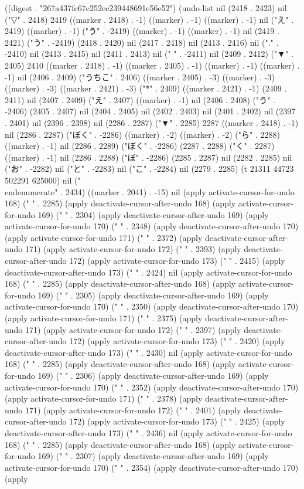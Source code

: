 
((digest . "267a437fc67e252ee239448691e56e52") (undo-list nil (2418 . 2423) nil ("▽" . 2418) 2419 ((marker . 2418) . -1) ((marker) . -1) ((marker) . -1) nil ("え" . 2419) ((marker) . -1) ("う" . -2419) ((marker) . -1) ((marker) . -1) nil (2419 . 2421) ("う" . -2419) (2418 . 2420) nil (2417 . 2418) nil (2413 . 2416) nil ("." . -2410) nil (2413 . 2415) nil (2411 . 2413) nil (" " . -2411) nil (2409 . 2412) ("▼" . 2405) 2410 ((marker . 2418) . -1) ((marker . 2405) . -1) ((marker) . -1) ((marker) . -1) nil (2406 . 2409) ("うちこ" . 2406) ((marker . 2405) . -3) ((marker) . -3) ((marker) . -3) ((marker . 2421) . -3) ("*" . 2409) ((marker . 2421) . -1) (2409 . 2411) nil (2407 . 2409) ("え" . 2407) ((marker) . -1) nil (2406 . 2408) ("う" . -2406) (2405 . 2407) nil (2404 . 2405) nil (2402 . 2403) nil (2401 . 2402) nil (2397 . 2401) nil (2396 . 2398) nil (2286 . 2287) ("▼" . 2285) 2287 ((marker . 2418) . -1) nil (2286 . 2287) ("ぼく" . -2286) ((marker) . -2) ((marker) . -2) ("ら" . 2288) ((marker) . -1) nil (2286 . 2289) ("ぼく" . -2286) (2287 . 2288) ("く" . 2287) ((marker) . -1) nil (2286 . 2288) ("ぼ" . -2286) (2285 . 2287) nil (2282 . 2285) nil ("お" . -2282) nil ("と" . -2283) nil ("こ" . -2284) nil (2279 . 2285) (t 21311 44723 502291 625000) nil ("\\end{enumerate}" . 2434) ((marker . 2041) . -15) nil (apply activate-cursor-for-undo 168) (" " . 2285) (apply deactivate-cursor-after-undo 168) (apply activate-cursor-for-undo 169) (" " . 2304) (apply deactivate-cursor-after-undo 169) (apply activate-cursor-for-undo 170) (" " . 2348) (apply deactivate-cursor-after-undo 170) (apply activate-cursor-for-undo 171) (" " . 2372) (apply deactivate-cursor-after-undo 171) (apply activate-cursor-for-undo 172) (" " . 2393) (apply deactivate-cursor-after-undo 172) (apply activate-cursor-for-undo 173) (" " . 2415) (apply deactivate-cursor-after-undo 173) (" " . 2424) nil (apply activate-cursor-for-undo 168) (" " . 2285) (apply deactivate-cursor-after-undo 168) (apply activate-cursor-for-undo 169) (" " . 2305) (apply deactivate-cursor-after-undo 169) (apply activate-cursor-for-undo 170) (" " . 2350) (apply deactivate-cursor-after-undo 170) (apply activate-cursor-for-undo 171) (" " . 2375) (apply deactivate-cursor-after-undo 171) (apply activate-cursor-for-undo 172) (" " . 2397) (apply deactivate-cursor-after-undo 172) (apply activate-cursor-for-undo 173) (" " . 2420) (apply deactivate-cursor-after-undo 173) (" " . 2430) nil (apply activate-cursor-for-undo 168) (" " . 2285) (apply deactivate-cursor-after-undo 168) (apply activate-cursor-for-undo 169) (" " . 2306) (apply deactivate-cursor-after-undo 169) (apply activate-cursor-for-undo 170) (" " . 2352) (apply deactivate-cursor-after-undo 170) (apply activate-cursor-for-undo 171) (" " . 2378) (apply deactivate-cursor-after-undo 171) (apply activate-cursor-for-undo 172) (" " . 2401) (apply deactivate-cursor-after-undo 172) (apply activate-cursor-for-undo 173) (" " . 2425) (apply deactivate-cursor-after-undo 173) (" " . 2436) nil (apply activate-cursor-for-undo 168) (" " . 2285) (apply deactivate-cursor-after-undo 168) (apply activate-cursor-for-undo 169) (" " . 2307) (apply deactivate-cursor-after-undo 169) (apply activate-cursor-for-undo 170) (" " . 2354) (apply deactivate-cursor-after-undo 170) (apply 